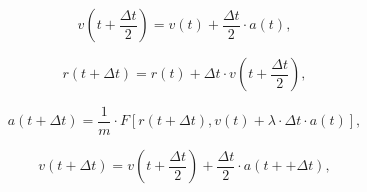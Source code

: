 \documentclass[12pt]{article}
\begin{document}
$$
  v(t+\frac{\Delta t}{2}) = v(t) + \frac{\Delta t}{2}\cdot a(t),
$$

$$
  r(t+\Delta t) = r(t) + \Delta t\cdot v(t+\frac{\Delta t}{2}),
$$

$$
  a(t+\Delta t) = \frac{1}{m}\cdot F\left[ r(t+\Delta t), v(t) +\lambda \cdot \Delta t\cdot a(t)\right],
$$

$$
  v(t+\Delta t) = v(t+\frac{\Delta t}{2}) + \frac{\Delta t}{2}\cdot a(t++\Delta t),
$$
\end{document}
